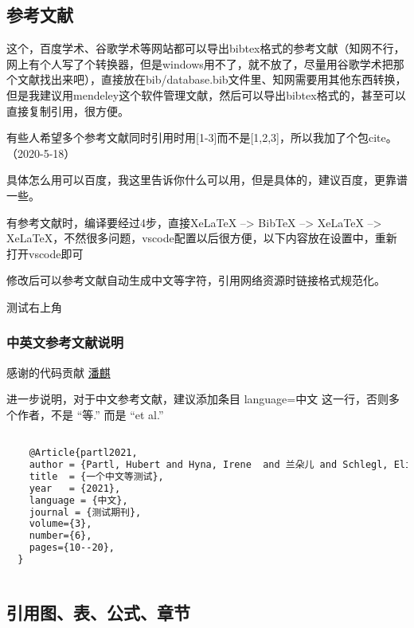\documentclass[AutoFakeBold]{LZUThesis}
\begin{document}
\subsection{参考文献} %
\label{sub:参考文献}

这个，百度学术、谷歌学术等网站都可以导出bibtex格式的参考文献（知网不行，网上有个人写了个转换器，但是windows用不了，就不放了，尽量用谷歌学术把那个文献找出来吧），直接放在bib/database.bib文件里、知网需要用其他东西转换，但是我建议用mendeley这个软件管理文献，然后可以导出bibtex格式的，甚至可以直接复制引用，很方便\cite{partl2016, tenne1992polyhedral, tussyadiah2015hotels}。

有些人希望多个参考文献同时引用时用[1-3]而不是[1,2,3]，所以我加了个包cite。（2020-5-18）

具体怎么用可以百度，我这里告诉你什么可以用，但是具体的，建议百度，更靠谱一些。


有参考文献时，编译要经过4步，直接XeLaTeX --> BibTeX --> XeLaTeX --> XeLaTeX，不然很多问题，vscode配置以后很方便，以下内容放在设置中，重新打开vscode即可

修改后可以参考文献自动生成中文等字符\cite{partl2021}\cite{partl2022}\cite{partl2022-2}，引用网络资源时链接格式规范化\cite{intelnewsroomIntelUnveils12th2021,wilsonHistoryDevelopmentParallel1994}。

测试右上角 

\subsubsection{中英文参考文献说明} %

感谢的代码贡献
\href{https://gitee.com/versemonger}{潘麒}

进一步说明，对于中文参考文献，建议添加条目 language={中文} 这一行，否则多个作者，不是 “等.”\cite{partl2021} 而是 “et al.”\cite{partl2016}
\begin{lstlisting}[language = tex]

    @Article{partl2021,
    author = {Partl, Hubert and Hyna, Irene  and 兰朵儿 and Schlegl, Elisabeth},
    title  = {一个中文等测试},
    year   = {2021},
    language = {中文},
    journal = {测试期刊},
    volume={3},
    number={6},
    pages={10--20},
  }
  
\end{lstlisting}




\subsection{引用图、表、公式、章节} %
\end{document}
